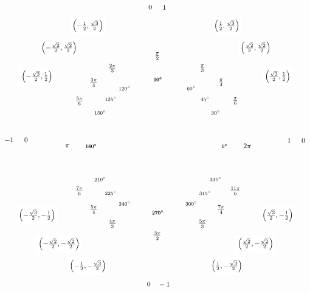 \documentclass[12pt,letterpaper]{exam}
\begin{document}
\begin{questions}
\[\begin{tikzpicture}[scale=5.5,cap=round,>=latex]
	\draw (-1.27cm,0cm) node[above=1pt] {$-1 \enskip\enskip\enskip 0$}
	(1.25cm,0cm)  node[above=1pt] {$1 \enskip\enskip\enskip 0$}
	(0.01cm,-1.25cm) node[] {$0 \quad -1$}
	(0cm,1.25cm)  node[] {$0 \enskip\enskip\enskip 1$};
	
	\foreach \x/\xtext/\y in {
		30/\frac{\sqrt{3}}{2}/\frac{1}{2},
		45/\frac{\sqrt{2}}{2}/\frac{\sqrt{2}}{2},
		60/\frac{1}{2}/\frac{\sqrt{3}}{2},
		150/-\frac{\sqrt{3}}{2}/\frac{1}{2},
		135/-\frac{\sqrt{2}}{2}/\frac{\sqrt{2}}{2},
		120/-\frac{1}{2}/\frac{\sqrt{3}}{2},
		210/-\frac{\sqrt{3}}{2}/-\frac{1}{2},
            	225/-\frac{\sqrt{2}}{2}/-\frac{\sqrt{2}}{2},
		240/-\frac{1}{2}/-\frac{\sqrt{3}}{2},
		330/\frac{\sqrt{3}}{2}/-\frac{1}{2},
		315/\frac{\sqrt{2}}{2}/-\frac{\sqrt{2}}{2},
		300/\frac{1}{2}/-\frac{\sqrt{3}}{2}}
		\draw (\x:1.25cm) node[fill=white] {$\left(\xtext,\y\right)$};
	
	\foreach \x/\xtext in {
    		30/\frac{\pi}{6},
    		45/\frac{\pi}{4},
    		60/\frac{\pi}{3},
    		90/\frac{\pi}{2},
    		120/\frac{2\pi}{3},
    		135/\frac{3\pi}{4},
    		150/\frac{5\pi}{6},
    		180/\pi,
    		210/\frac{7\pi}{6},
    		225/\frac{5\pi}{4},
    		240/\frac{4\pi}{3},
    		270/\frac{3\pi}{2},
    		300/\frac{5\pi}{3},
    		315/\frac{7\pi}{4},
    		330/\frac{11\pi}{6},
    		360/2\pi}
		\draw (\x:0.81cm) node[] {$\xtext$};

	\foreach \x in {0,30,...,330} {
		\draw (\x:0.6cm) node[] {\scriptsize \,$\x^\circ$};
	}
	
	\foreach \x in {0,45,...,315} {
		\draw (\x:0.6cm) node[] {\scriptsize \,$\x^\circ$};
	}	
	\end{tikzpicture}
	\]



\newpage
{} \par\vspace{0.3cm}


\end{questions}
\end{document}
